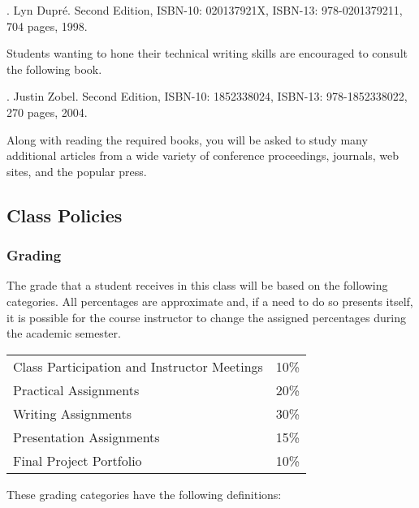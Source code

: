 . Lyn Dupr\'e. Second Edition, ISBN-10: 020137921X,
ISBN-13: 978-0201379211, 704 pages, 1998.

\noindent
Students wanting to hone their technical writing skills are encouraged to consult the following book.

. Justin Zobel. Second Edition, ISBN-10: 1852338024, ISBN-13:
978-1852338022, 270 pages, 2004.

\noindent Along with reading the required books, you will be asked to study many additional articles from a wide variety
of conference proceedings, journals, web sites, and the popular press.

\subsection*{Class Policies}

\subsubsection*{Grading}

The grade that a student receives in this class will be based on the following categories. All percentages are
approximate and, if a need to do so presents itself, it is possible for the course instructor to change the assigned
percentages during the academic semester.

\begin{center}
  \begin{tabular}{ll}

    Class Participation and Instructor Meetings & 10\% \\
    Practical Assignments                       & 20\% \\
    Writing Assignments                         & 30\% \\
    Presentation Assignments                    & 15\% \\
    Final Project Portfolio                     & 10\%

  \end{tabular}
\end{center}

\noindent
\vspace*{-.1in}
These grading categories have the following definitions:

